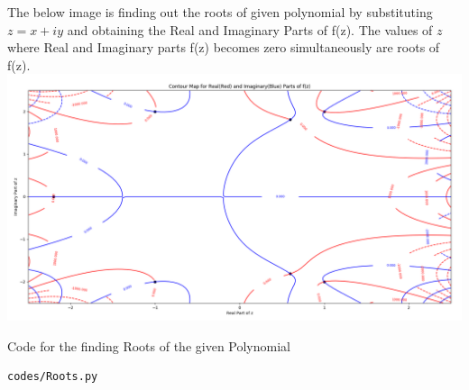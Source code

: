 The below image is finding out the roots of given polynomial by substituting $z=x+iy$ and obtaining the Real and Imaginary Parts of f(z). The values of $z$ where Real and Imaginary parts f(z) becomes zero simultaneously are roots of f(z).\\
\includegraphics[scale=0.15]{figs/f(z).png}

Code for the finding Roots of the given Polynomial
\begin{lstlisting}
codes/Roots.py
\end{lstlisting}
